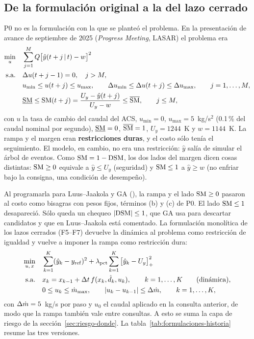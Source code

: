 \subsection{De la formulación original a la del lazo cerrado}\label{sec:formulacion-final}
P0 no es la formulación con la que se planteó el problema. En la presentación de avance de
septiembre de 2025 (\emph{Progress Meeting}, LASAR) el problema era
\begin{align*}
\min_{u}\quad & \sum_{j=1}^{M}Q\big[\hat y(t+j\,|\,t)-w\big]^2\\
\text{s.a.}\quad & \Delta u(t+j-1)=0,\quad j>M,\\
& u_{\min}\le u(t+j)\le u_{\max},\qquad \Delta u_{\min}\le\Delta u(t+j)\le\Delta u_{\max},\qquad j=1,\dots,M,\\
& \underline{\rm SM}\le{\rm SM}(t+j)=\frac{U_y-\hat y(t+j)}{U_y-w}\le\overline{\rm SM},\qquad j\le M,
\end{align*}
con $u$ la tasa de cambio del caudal del ACS, $u_{\min}=0$, $u_{\max}=5$~kg/s$^2$ (0.1\,\% del
caudal nominal por segundo), $\underline{\rm SM}=0$, $\overline{\rm SM}=1$, $U_y=1244$~K y
$w=1144$~K. La rampa y el margen eran \textbf{restricciones duras}, y el costo sólo tenía el
seguimiento. El modelo, en cambio, no era una restricción: $\hat y$ salía de simular el árbol
de eventos. Como ${\rm SM}=1-{\rm DSM}$, los dos lados del margen dicen cosas distintas:
${\rm SM}\ge0$ equivale a $\hat y\le U_y$ (seguridad) y ${\rm SM}\le1$ a $\hat y\ge w$ (no
enfriar bajo la consigna, una condición de desempeño).

Al programarla para Luus--Jaakola y GA (), la rampa y el lado
${\rm SM}\ge0$ pasaron al costo como bisagras con pesos fijos, términos (b) y (c) de P0. El
lado ${\rm SM}\le1$ desapareció. Sólo queda un chequeo $|{\rm DSM}|\le1$, que GA usa para
descartar candidatos y que en Luus--Jaakola está comentado. La formulación monolítica de los
lazos cerrados (F5--F7) devuelve la dinámica al problema como restricción de igualdad y
vuelve a imponer la rampa como restricción dura:
\begin{align*}
\min_{u,\,x}\quad & \sum_{k=1}^{K}(\hat y_k-y_{\rm ref})^2+\lambda_{\rm pct}\sum_{k=1}^{K}\big[\hat y_k-U_y\big]_+^2\\
\text{s.a.}\quad & x_k=x_{k-1}+\Delta t\,f(x_k,\hat d_k,u_k),\qquad k=1,\dots,K\qquad\text{(dinámica)},\\
& 0\le u_k\le\dot m_{\max},\qquad |u_k-u_{k-1}|\le\Delta\dot m,\qquad k=1,\dots,K,
\end{align*}
con $\Delta\dot m=5$~kg/s por paso y $u_0$ el caudal aplicado en la consulta anterior, de modo
que la rampa también vale entre consultas. A esto se suma la capa de riesgo de la
sección~\ref{sec:riesgo-donde}. La tabla~\ref{tab:formulaciones-historia} resume las tres
versiones.

